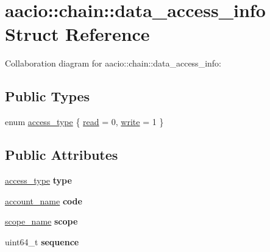 \hypertarget{structaacio_1_1chain_1_1data__access__info}{}\section{aacio\+:\+:chain\+:\+:data\+\_\+access\+\_\+info Struct Reference}
\label{structaacio_1_1chain_1_1data__access__info}


Collaboration diagram for aacio\+:\+:chain\+:\+:data\+\_\+access\+\_\+info\+:
\subsection*{Public Types}
\begin{DoxyCompactItemize}
\item 
enum \mbox{\hyperlink{structaacio_1_1chain_1_1data__access__info_a64397053b2a76272ac46888150944b57}{access\+\_\+type}} \{ \mbox{\hyperlink{structaacio_1_1chain_1_1data__access__info_a64397053b2a76272ac46888150944b57aeae8a88a13d17788fe454bdb73249f1e}{read}} = 0, 
\mbox{\hyperlink{structaacio_1_1chain_1_1data__access__info_a64397053b2a76272ac46888150944b57afeb4597d5630837c7d8d36269367fef8}{write}} = 1
 \}
\end{DoxyCompactItemize}
\subsection*{Public Attributes}
\begin{DoxyCompactItemize}
\item 
\mbox{\label{structaacio_1_1chain_1_1data__access__info_adc506c7e4feab7e260a9544dbee28db6}} 
\mbox{\hyperlink{structaacio_1_1chain_1_1data__access__info_a64397053b2a76272ac46888150944b57}{access\+\_\+type}} {\bfseries type}
\item 
\mbox{\label{structaacio_1_1chain_1_1data__access__info_ad5da4b0462e2ab97dca0b5a5ac2ac263}} 
\mbox{\hyperlink{structaacio_1_1chain_1_1name}{account\+\_\+name}} {\bfseries code}
\item 
\mbox{\label{structaacio_1_1chain_1_1data__access__info_a0b6b9733fc6e732e390168ce727ad6bb}} 
\mbox{\hyperlink{structaacio_1_1chain_1_1name}{scope\+\_\+name}} {\bfseries scope}
\item 
\mbox{\label{structaacio_1_1chain_1_1data__access__info_a77fca37f4d47e49a7dcd6e02954e694f}} 
uint64\+\_\+t {\bfseries sequence}
\end{DoxyCompactItemize}


